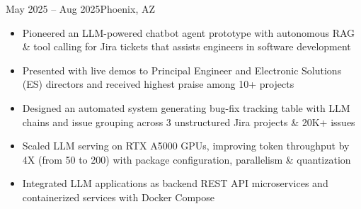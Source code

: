     {}
    {May 2025 -- Aug 2025}{Phoenix, AZ}{}
\begin{itemize}
    \item Pioneered an LLM-powered chatbot agent prototype with autonomous RAG \& tool calling
    for Jira tickets that assists engineers in 
    software development
    \item Presented with live demos to Principal Engineer and Electronic Solutions (ES) directors 
    and received highest praise among 10+ projects
    \item Designed an automated system generating bug-fix tracking table 
    with LLM chains and issue grouping across 3 unstructured Jira projects \& 20K+ issues

    \item Scaled LLM serving on RTX A5000 GPUs, improving token throughput by 4X (from 50 to 200) 
    with package configuration, parallelism \& quantization 
    \item Integrated LLM applications as backend REST API microservices and 
    containerized services with Docker Compose
    
\end{itemize}
\dividerSmall


